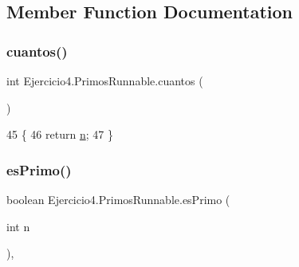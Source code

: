 \subsection{Member Function Documentation}
\mbox{\label{class_ejercicio4_1_1_primos_runnable_a99b8b16e1ea146e1e0c3938c881851ee}} 
\subsubsection{\texorpdfstring{cuantos()}{cuantos()}}
{\footnotesize\ttfamily int Ejercicio4.\+Primos\+Runnable.\+cuantos (\begin{DoxyParamCaption}{ }\end{DoxyParamCaption})\hspace{0.3cm}{\ttfamily [inline]}}


\begin{DoxyCode}
45                         \{
46         \textcolor{keywordflow}{return} \mbox{\hyperlink{class_ejercicio4_1_1_primos_runnable_a891fd5a28f4e81d096573d60d73a27dc}{n}};
47     \}
\end{DoxyCode}
\mbox{\label{class_ejercicio4_1_1_primos_runnable_a613d7d8583b20db4b1cd1c23f545aa56}} 
\subsubsection{\texorpdfstring{es\+Primo()}{esPrimo()}}
{\footnotesize\ttfamily boolean Ejercicio4.\+Primos\+Runnable.\+es\+Primo (\begin{DoxyParamCaption}\item[{int}]{n }\end{DoxyParamCaption})\hspace{0.3cm}{\ttfamily [inline]}, {\ttfamily [private]}}


